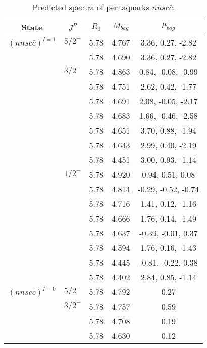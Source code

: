 \documentclass[prd,twocolumn,floatfix,nofootinbib]{revtex4}
\begin{document}
\renewcommand{\tabcolsep}{0.5cm}
\renewcommand{\arraystretch}{1.2}
\begin{table*}[!htbp]
    \caption{Predicted spectra of pentaquarks $nnsc\bar{c}$.}
    \begin{tabular}{ccccc}
        \hline\hline
        {\rm State} &$J^{P}$ &$R_{0}$ &$M_{bag}$ &$\mu_{bag}$ \\ \hline
        ${(nnsc\bar{c})}^{I=1}$
            &${5/2}^{-}$    &5.78   &4.767 &3.36, 0.27, -2.82 \\
            &               &5.78   &4.690 &3.36, 0.27, -2.82  \\
            &${3/2}^{-}$    &5.78   &4.863 &0.84, -0.08, -0.99  \\
            &               &5.78   &4.751 &2.62, 0.42, -1.77  \\
            &               &5.78   &4.691 &2.08, -0.05, -2.17  \\
            &               &5.78   &4.683 &1.66, -0.46, -2.58  \\
            &               &5.78   &4.651 &3.70, 0.88, -1.94  \\
            &               &5.78   &4.643 &2.99, 0.40, -2.19  \\
            &               &5.78   &4.451 &3.00, 0.93, -1.14  \\
            &${1/2}^{-}$    &5.78   &4.920 &0.94, 0.51, 0.08  \\
            &               &5.78   &4.814 &-0.29, -0.52, -0.74  \\
            &               &5.78   &4.716 &1.41, 0.12, -1.16 \\
            &               &5.78   &4.666 &1.76, 0.14, -1.49  \\
            &               &5.78   &4.637 &-0.39, -0.01, 0.37  \\
            &               &5.78   &4.594 &1.76, 0.16, -1.43  \\
            &               &5.78   &4.445 &-0.81, -0.22, 0.38 \\
            &               &5.78   &4.402 &2.84, 0.85, -1.14 \\
        ${(nnsc\bar{c})}^{I=0}$
            &${5/2}^{-}$    &5.78   &4.792 &0.27 \\
            &${3/2}^{-}$    &5.78   &4.757 &0.59 \\
            &               &5.78   &4.708 &0.19  \\
            &               &5.78   &4.630 &0.12  \\

\end{tabular}
\end{table*}
\end{document}
